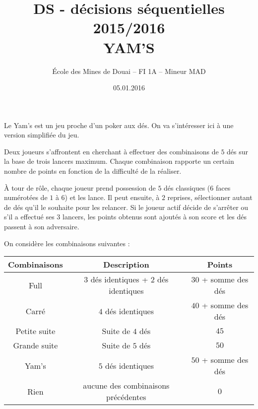 \documentclass[a4paper, 10pt]{article}
\begin{document}
\author{\'Ecole des Mines de Douai -- FI 1A -- Mineur MAD}
\date{05.01.2016}
\title{\Large{\textbf{DS - décisions séquentielles 2015/2016 \\ YAM'S}}}
\maketitle
\thispagestyle{fancy}


\bigskip




Le Yam's est un jeu proche d'un poker aux dés. On va s'intéresser ici à une version simplifiée du jeu.

\smallskip

Deux joueurs s'affrontent en cherchant à effectuer des combinaisons de $5$ dés sur la base de trois lancers maximum. Chaque combinaison rapporte un certain nombre de points en fonction de la difficulté de la réaliser.

\smallskip

À tour de rôle, chaque joueur prend possession de $5$ dés classiques ($6$ faces numérotées de $1$ à $6$) et les lance. Il peut ensuite, à $2$ reprises, sélectionner autant de dés qu'il le souhaite pour les relancer. Si le joueur actif décide de s'arrêter ou s'il a effectué ses $3$ lancers, les points obtenus sont ajoutés à son score et les dés passent à son adversaire. 

\smallskip

On considère les combinaisons suivantes : 

\smallskip

\begin{center}
   \begin{tabular}{|c|c|c|}
    \hline
    Combinaisons & Description & Points \\
    \hline
    Full & $3$ dés identiques + $2$ dés identiques & $30$ + somme des dés \\
    \hline
    Carré & $4$ dés identiques & $40$ + somme des dés \\
    \hline
    Petite suite & Suite de $4$ dés & $45$ \\
    \hline
    Grande suite & Suite de $5$ dés & $50$ \\
    \hline
    Yam's & $5$ dés identiques & $50$ + somme des dés \\
    \hline
    Rien & aucune des combinaisons précédentes & $0$ \\
    \hline
  \end{tabular}

\end{center}
\end{document}
